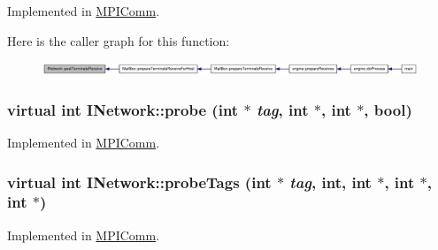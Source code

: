 Implemented in \hyperlink{class_m_p_i_comm_a15aa65ec7dcb1da5fa042fd6d98f1578}{MPIComm}.

Here is the caller graph for this function:\nopagebreak
\begin{figure}[H]
\begin{center}
\leavevmode
\includegraphics[width=420pt]{class_i_network_ae8381635a24542ac374056c15613daeb_icgraph}
\end{center}
\end{figure}
\hypertarget{class_i_network_ab653bd28450c18a74826d06069ed3ed1}{
\subsubsection[{probe}]{\setlength{\rightskip}{0pt plus 5cm}virtual int INetwork::probe (int $\ast$ {\em tag}, \/  int $\ast$, \/  int $\ast$, \/  bool)}}
\label{class_i_network_ab653bd28450c18a74826d06069ed3ed1}


Implemented in \hyperlink{class_m_p_i_comm_a1c1a72b9cf6cac8a5af0e8dc6a085c87}{MPIComm}.\hypertarget{class_i_network_a85b398c3932251d6c0d9698004eb01e7}{
\subsubsection[{probeTags}]{\setlength{\rightskip}{0pt plus 5cm}virtual int INetwork::probeTags (int $\ast$ {\em tag}, \/  int, \/  int $\ast$, \/  int $\ast$, \/  int $\ast$)}}
\label{class_i_network_a85b398c3932251d6c0d9698004eb01e7}


Implemented in \hyperlink{class_m_p_i_comm_a5e2fdc3d30c9e2ef04fc81fa99e8cd3f}{MPIComm}.

